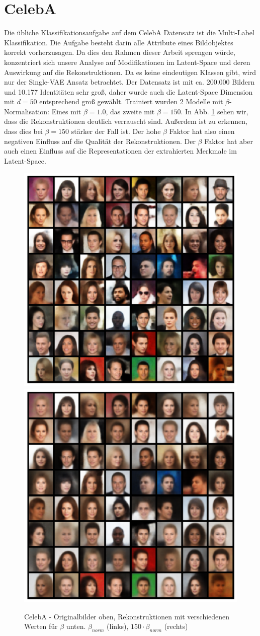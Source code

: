 \section{CelebA}
Die übliche Klassifikationsaufgabe auf dem CelebA Datensatz ist die Multi-Label Klassifikation. Die Aufgabe besteht darin alle Attribute eines Bildobjektes korrekt vorherzusagen. Da dies den Rahmen dieser Arbeit sprengen würde, konzentriert sich unsere Analyse auf Modifikationen im Latent-Space und deren Auswirkung auf die Rekonstruktionen. Da es keine eindeutigen Klassen gibt, wird nur der Single-VAE Ansatz betrachtet. Der Datensatz ist mit ca. 200.000 Bildern  und 10.177 Identitäten sehr groß, daher wurde auch die Latent-Space Dimension mit $d = 50$ entsprechend groß gewählt. Trainiert wurden 2 Modelle mit $\beta$-Normalisation: Eines mit $\beta = 1.0$, das zweite mit $\beta = 150$. In Abb. \ref{fig:celeba_recon} sehen wir, dass die Rekonstruktionen deutlich verrauscht sind. Außerdem ist zu erkennen, dass dies bei $\beta = 150$ stärker der Fall ist. Der hohe $\beta$ Faktor hat also einen negativen Einfluss auf die Qualität der Rekonstruktionen. Der $\beta$ Faktor hat aber auch einen Einfluss auf die Representationen der extrahierten Merkmale im Latent-Space.

\begin{figure}[hbt]
  \centering
  \includegraphics[width=.49\textwidth]{gfx/evaluation/celeba/fake-regular}
  \includegraphics[width=.49\textwidth]{gfx/evaluation/celeba/fake-beta}
  \caption{CelebA - Originalbilder oben, Rekonstruktionen mit verschiedenen Werten für $\beta$ unten. $\beta_{norm}$ (links), $150 \cdot \beta_{norm}$ (rechts)}
  \label{fig:celeba_recon}
\end{figure}

